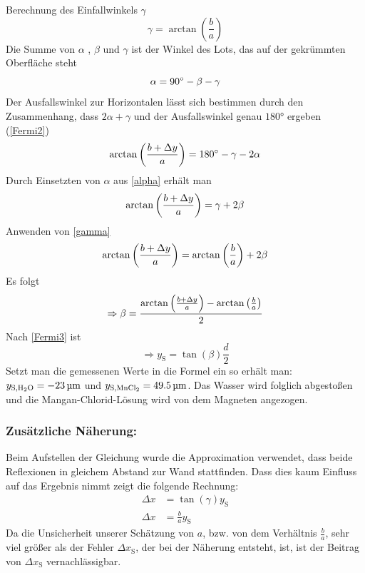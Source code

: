\documentclass[
	a4paper,
	12pt,
	pagesize,
	ngerman
]{scrartcl}
\begin{document}
	\noindent{}Berechnung des Einfallwinkels $\gamma$
	\begin{equation}
		\gamma = \arctan \left(\frac{b}{a}\right) 
		\label{gamma}
	\end{equation}
	Die Summe von $\alpha$ , $\beta$ und $\gamma$ ist der Winkel des Lots, das auf der gekrümmten Oberfläche steht
	\begin{equation}
		\alpha = \ang{90} - \beta - \gamma \\
		\label{alpha}
	\end{equation}
	Der Ausfallswinkel zur Horizontalen lässt sich bestimmen durch den Zusammenhang, dass $2\alpha + \gamma$ und der Ausfallswinkel genau $\ang{180}$ ergeben (\cref{Fermi2})
	\begin{equation}
		\arctan \left(\frac{b+\Delta y}{a}\right) = \ang{180} - \gamma - 2\alpha \\
	\end{equation}
	Durch Einsetzten von $\alpha$ aus \cref{alpha} erhält man
	\begin{equation}
		\arctan \left(\frac{b+\Delta y}{a}\right) = \gamma + 2 \beta \\
	\end{equation}
	Anwenden von \cref{gamma}
	\begin{equation}
		\arctan \left(\frac{b+\Delta y}{a}\right) =   \arctan \left(\frac{b}{a}\right) + 2 \beta \\
	\end{equation}
	Es folgt
	\begin{equation}
		\Rightarrow \beta = \frac{\arctan \left(\frac{b+\Delta y}{a}\right) -  \arctan \left(\frac{b}{a}\right)}{2} \\
	\end{equation}
	Nach \cref{Fermi3} ist
	\begin{equation}
		\Rightarrow y_\text{S} = \tan (\beta) \frac{d}{2}  
	\end{equation}
	Setzt man die gemessenen Werte in die Formel ein so erhält man: $ y_{\text{S,\ce{H2O}}} = \SI{-23}{\micro \meter} $ und $y_{\text{S,\ce{MnCl2}}} = \SI{49,5}{ \micro \meter} $. Das Wasser wird folglich abgestoßen und die Mangan-Chlorid-Lösung wird von dem Magneten angezogen.
	
	\subsubsection*{Zusätzliche Näherung:}
	Beim Aufstellen der Gleichung wurde die Approximation verwendet, dass beide Reflexionen in gleichem Abstand zur Wand stattfinden. Dass dies kaum Einfluss auf das Ergebnis nimmt zeigt die folgende Rechnung: %
	\begin{align}
		\Delta x &= \tan (\gamma) y_\text{S} \\
		\Delta x &= \frac{b}{a} y_\text{S}
	\end{align}
	Da die Unsicherheit unserer Schätzung von $a$, bzw. von dem Verhältnis $\frac{b}{a}$, sehr viel größer als der Fehler $\Delta x_\text{S}$, der bei der Näherung entsteht, ist, ist der Beitrag von $\Delta x_\text{S}$ vernachlässigbar.
\end{document}
